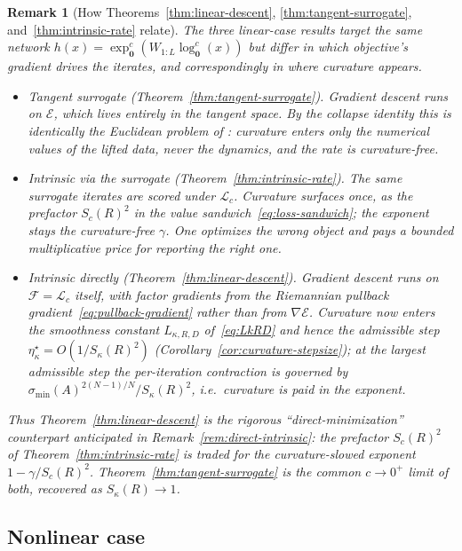 \documentclass[letterpaper]{article}
\newcommand{\exps}{\exp_{\mathbf{0}}^c}
\newcommand{\logs}{\log_{\mathbf{0}}^c}
\newtheorem{remark}[theorem]{Remark}
\begin{document}
\begin{remark}[How Theorems~\ref{thm:linear-descent}, \ref{thm:tangent-surrogate}, and~\ref{thm:intrinsic-rate} relate]
\label{rem:three-linear}
The three linear-case results target the same network
$h(x)=\exps(W_{1:L}\logs(x))$ but differ in \emph{which objective's gradient
drives the iterates}, and correspondingly in \emph{where curvature appears}.
\begin{itemize}[leftmargin=1.4em,itemsep=2pt]
\item \emph{Tangent surrogate (Theorem~\ref{thm:tangent-surrogate}).}
Gradient descent runs on $\mathcal E$, which lives entirely in the tangent
space. By the collapse identity this is \emph{identically} the Euclidean
problem of \cite{arora2018convergence}: curvature enters only the numerical
values of the lifted data, never the dynamics, and the rate is curvature-free.
\item \emph{Intrinsic via the surrogate (Theorem~\ref{thm:intrinsic-rate}).}
The \emph{same} surrogate iterates are scored under $\mathcal L_c$. Curvature
surfaces once, as the prefactor $S_c(R)^2$ in the value
sandwich~\eqref{eq:loss-sandwich}; the exponent stays the curvature-free
$\gamma$. One optimizes the wrong object and pays a bounded multiplicative
price for reporting the right one.
\item \emph{Intrinsic directly (Theorem~\ref{thm:linear-descent}).}
Gradient descent runs on $\mathcal F=\mathcal L_c$ itself, with factor
gradients from the Riemannian pullback gradient~\eqref{eq:pullback-gradient}
rather than from $\nabla\mathcal E$. Curvature now enters the \emph{smoothness
constant} $L_{\kappa,R,D}$ of~\eqref{eq:LkRD} and hence the admissible step
$\eta^\star_\kappa=O(1/S_\kappa(R)^2)$
(Corollary~\ref{cor:curvature-stepsize}); at the largest admissible step the
per-iteration contraction is governed by
$\sigma_{\min}(A)^{2(N-1)/N}/S_\kappa(R)^2$, i.e.\ curvature is paid in the
\emph{exponent}.
\end{itemize}
Thus Theorem~\ref{thm:linear-descent} is the rigorous ``direct-minimization''
counterpart anticipated in Remark~\ref{rem:direct-intrinsic}: the prefactor
$S_c(R)^2$ of Theorem~\ref{thm:intrinsic-rate} is traded for the
curvature-slowed exponent $1-\gamma/S_c(R)^2$. Theorem~\ref{thm:tangent-surrogate}
is the common $c\to0^+$ limit of both, recovered as $S_\kappa(R)\to1$.
\end{remark}

\subsection{Nonlinear case}
\label{sec:main-nonlinear}
\end{document}
